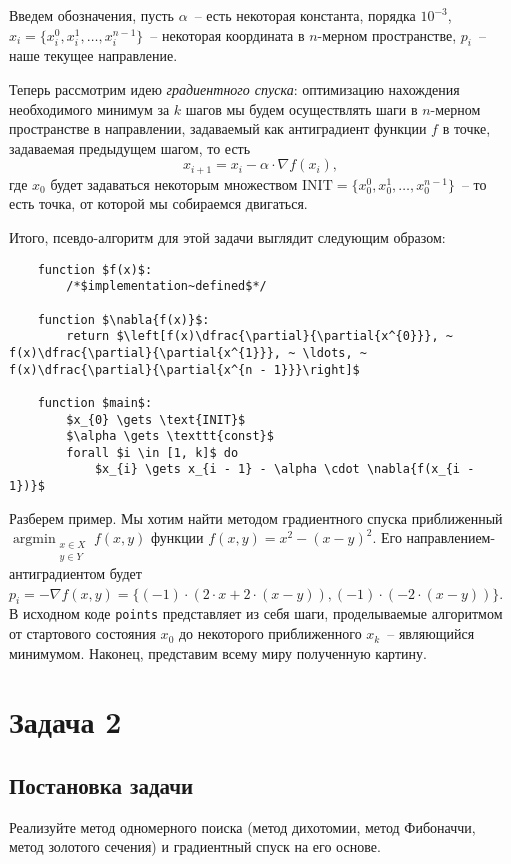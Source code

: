 \documentclass[12pt, a4paper, oneside]{article}
\begin{document}
	Введем обозначения, пусть $\alpha$~-- есть некоторая константа, порядка $10^{-3}$, $x_{i} = \{x^{0}_{i}, x^{1}_{i}, \ldots, x^{n - 1}_{i}\}$~-- некоторая координата в $n$-мерном пространстве, $p_{i}$~-- наше текущее направление.

	Теперь рассмотрим идею \textit{градиентного спуска}: оптимизацию нахождения необходимого минимум за $k$ шагов мы будем осуществлять шаги в $n$-мерном пространстве в направлении, задаваемый как антиградиент функции $f$ в точке, задаваемая предыдущем шагом, то есть
	\[
		x_{i + 1} = x_{i} - \alpha \cdot \nabla{f(x_{i})},
	\] где $x_{0}$ будет задаваться некоторым множеством $\text{INIT} = \{x^{0}_{0}, x^{1}_{0}, \ldots, x^{n - 1}_{0}\}$~-- то есть точка, от которой мы собираемся двигаться.

	Итого, псевдо-алгоритм для этой задачи выглядит следующим образом:
	\begin{lstlisting}
	function $f(x)$:
		/*$implementation~defined$*/
	
	function $\nabla{f(x)}$:
		return $\left[f(x)\dfrac{\partial}{\partial{x^{0}}}, ~ f(x)\dfrac{\partial}{\partial{x^{1}}}, ~ \ldots, ~ f(x)\dfrac{\partial}{\partial{x^{n - 1}}}\right]$
	
	function $main$:
		$x_{0} \gets \text{INIT}$
		$\alpha \gets \texttt{const}$
		forall $i \in [1, k]$ do
			$x_{i} \gets x_{i - 1} - \alpha \cdot \nabla{f(x_{i - 1})}$
	\end{lstlisting}
	Разберем пример. Мы хотим найти методом градиентного спуска приближенный $\operatorname*{argmin}_{\substack{x \in X  \\ y \in Y}}{f(x, y)}$ функции $f(x, y) = x^{2} - (x - y)^{2}$. Его направлением-антиградиентом будет $p_{i} = -\nabla{f(x, y)} = \{(-1) \cdot (2 \cdot x + 2 \cdot (x - y)), (-1) \cdot (-2 \cdot (x - y))\}$. 
	В исходном коде \texttt{points} представляет из себя шаги, проделываемые алгоритмом от стартового состояния $x_{0}$ до некоторого приближенного $x_{k}$~-- являющийся минимумом. Наконец, представим всему миру полученную картину.
	\begin{flushleft}
		
	\end{flushleft}
	\section*{Задача 2}
	\subsection*{Постановка задачи}
	Реализуйте метод одномерного поиска (метод дихотомии, метод Фибоначчи, метод золотого сечения) и градиентный спуск на его основе.
\end{document}
